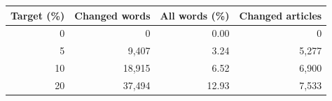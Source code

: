 \begin{tabular}{rrrr}
\toprule
Target (\%) & Changed words & All words (\%) & Changed articles \\
\midrule
0 & 0 & 0.00 & 0 \\
5 & 9,407 & 3.24 & 5,277 \\
10 & 18,915 & 6.52 & 6,900 \\
20 & 37,494 & 12.93 & 7,533 \\
\bottomrule
\end{tabular}
